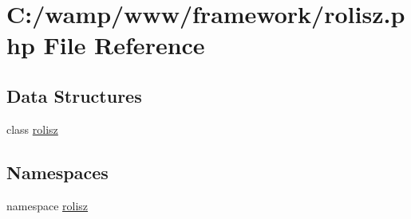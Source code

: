 \hypertarget{rolisz_8php}{
\section{C:/wamp/www/framework/rolisz.php File Reference}
\label{rolisz_8php}
}
\subsection*{Data Structures}
\begin{DoxyCompactItemize}
\item 
class \hyperlink{classrolisz}{rolisz}
\end{DoxyCompactItemize}
\subsection*{Namespaces}
\begin{DoxyCompactItemize}
\item 
namespace \hyperlink{namespacerolisz}{rolisz}
\end{DoxyCompactItemize}
